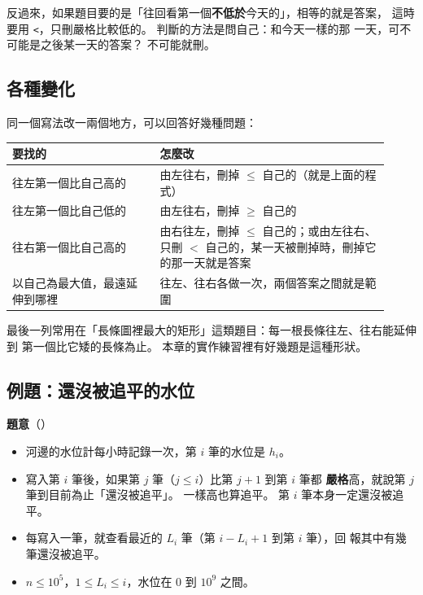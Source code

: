 反過來，如果題目要的是「往回看第一個\textbf{不低於}今天的」，相等的就是答案，
這時要用 \texttt{<}，只刪嚴格比較低的。 判斷的方法是問自己：和今天一樣的那
一天，可不可能是之後某一天的答案？ 不可能就刪。

\subsection{各種變化}

同一個寫法改一兩個地方，可以回答好幾種問題：

\begin{center}
\begin{tabular}{p{0.36\linewidth}p{0.56\linewidth}}
\toprule
要找的 & 怎麼改 \\
\midrule
往左第一個比自己高的 & 由左往右，刪掉 $\le$ 自己的（就是上面的程式） \\
往左第一個比自己低的 & 由左往右，刪掉 $\ge$ 自己的 \\
往右第一個比自己高的 & 由右往左，刪掉 $\le$ 自己的；或由左往右、只刪 $<$ 自己的，某一天被刪掉時，刪掉它的那一天就是答案 \\
以自己為最大值，最遠延伸到哪裡 & 往左、往右各做一次，兩個答案之間就是範圍 \\
\bottomrule
\end{tabular}
\end{center}

最後一列常用在「長條圖裡最大的矩形」這類題目：每一根長條往左、往右能延伸到
第一個比它矮的長條為止。 本章的實作練習裡有好幾題是這種形狀。

\subsection{例題：還沒被追平的水位}
\label{sec:ex-water}

\textbf{題意}（）

\begin{itemize}
\item 河邊的水位計每小時記錄一次，第 $i$ 筆的水位是 $h_i$。
\item 寫入第 $i$ 筆後，如果第 $j$ 筆（$j \le i$）比第 $j+1$ 到第 $i$ 筆都
\textbf{嚴格}高，就說第 $j$ 筆到目前為止「還沒被追平」。 一樣高也算追平。 第
$i$ 筆本身一定還沒被追平。
\item 每寫入一筆，就查看最近的 $L_i$ 筆（第 $i - L_i + 1$ 到第 $i$ 筆），回
報其中有幾筆還沒被追平。
\item $n \le 10^5$，$1 \le L_i \le i$，水位在 $0$ 到 $10^9$ 之間。
\end{itemize}

